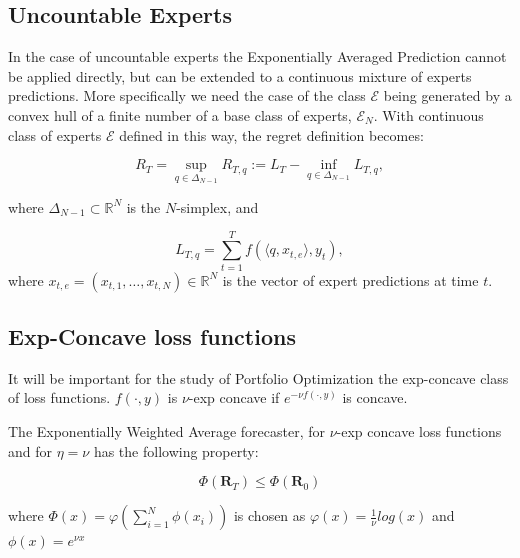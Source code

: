 \subsection{Uncountable Experts}\label{sec:uncountable_exp}

In the case of uncountable experts the Exponentially Averaged Prediction cannot be applied directly, but can be extended to a continuous mixture of experts predictions. More specifically we need the case of the class $\mathcal E$ being generated by a convex hull of a finite number of a base class of experts, $\mathcal E_N$.
With continuous class of experts $\mathcal E$ defined in this way, the regret definition becomes:

\begin{equation}
    R_T = \sup\limits_{q\in\Delta_{N-1}}R_{T,q}:=L_T-\inf\limits_{q\in\Delta_{N-1}}L_{T,q},
\end{equation}



where $\Delta_{N-1}\subset \mathbb R^{N}$ is the $N$-simplex, and 

$$L_{T,q}=\sum\limits_{t=1}^T f(\langle q,x_{t,e}\rangle,y_t),$$
where $x_{t,e}=(x_{t,1},\ldots,x_{t,N})\in\mathbb R^N$ is the vector of expert predictions at time $t$.
\subsection{Exp-Concave loss functions}
It will be important for the study of Portfolio Optimization the exp-concave class of loss functions.
$f(\cdot,y)$ is $\nu$-exp concave if $e^{-\nu f(\cdot,y)}$ is concave.

\begin{theorem}\label{th:General_Blk}
The Exponentially Weighted Average forecaster, for $\nu$-exp concave loss functions and for $\eta=\nu$ has the following property:

$$\Phi(\mathbf R_T)\le \Phi(\mathbf R_0)$$

where $\Phi(x)=\varphi\left(\sum\limits_{i=1}^N\phi(x_i)\right)$ is chosen as $\varphi(x)=\frac{1}{\nu}log(x)$ and $\phi(x)=e^{\nu x}$

\end{theorem}

